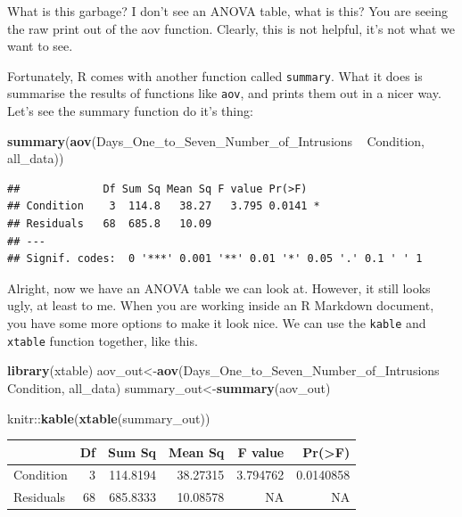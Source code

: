 \documentclass[]{book}
\newenvironment{Shaded}{\begin{snugshade}}{\end{snugshade}}
\newcommand{\KeywordTok}[1]{\textcolor[rgb]{0.13,0.29,0.53}{\textbf{{#1}}}}
\newcommand{\StringTok}[1]{\textcolor[rgb]{0.31,0.60,0.02}{{#1}}}
\newcommand{\NormalTok}[1]{{#1}}
\theoremstyle{definition}
\theoremstyle{definition}
\theoremstyle{definition}
\theoremstyle{remark}
\begin{document}
What is this garbage? I don't see an ANOVA table, what is this? You are
seeing the raw print out of the aov function. Clearly, this is not
helpful, it's not what we want to see.

Fortunately, R comes with another function called \texttt{summary}. What
it does is summarise the results of functions like \texttt{aov}, and
prints them out in a nicer way. Let's see the summary function do it's
thing:

\begin{Shaded}
\begin{Highlighting}[]
\KeywordTok{summary}\NormalTok{(}\KeywordTok{aov}\NormalTok{(Days_One_to_Seven_Number_of_Intrusions ~}\StringTok{ }\NormalTok{Condition, all_data))}
\end{Highlighting}
\end{Shaded}

\begin{verbatim}
##             Df Sum Sq Mean Sq F value Pr(>F)  
## Condition    3  114.8   38.27   3.795 0.0141 *
## Residuals   68  685.8   10.09                 
## ---
## Signif. codes:  0 '***' 0.001 '**' 0.01 '*' 0.05 '.' 0.1 ' ' 1
\end{verbatim}

Alright, now we have an ANOVA table we can look at. However, it still
looks ugly, at least to me. When you are working inside an R Markdown
document, you have some more options to make it look nice. We can use
the \texttt{kable} and \texttt{xtable} function together, like this.

\begin{Shaded}
\begin{Highlighting}[]
\KeywordTok{library}\NormalTok{(xtable)}
\NormalTok{aov_out<-}\KeywordTok{aov}\NormalTok{(Days_One_to_Seven_Number_of_Intrusions ~}\StringTok{ }\NormalTok{Condition, all_data)}
\NormalTok{summary_out<-}\KeywordTok{summary}\NormalTok{(aov_out)}

\NormalTok{knitr::}\KeywordTok{kable}\NormalTok{(}\KeywordTok{xtable}\NormalTok{(summary_out))}
\end{Highlighting}
\end{Shaded}

\begin{tabular}{l|r|r|r|r|r}
\hline
  & Df & Sum Sq & Mean Sq & F value & Pr(>F)\\
\hline
Condition & 3 & 114.8194 & 38.27315 & 3.794762 & 0.0140858\\
\hline
Residuals & 68 & 685.8333 & 10.08578 & NA & NA\\
\hline
\end{tabular}
\end{document}
